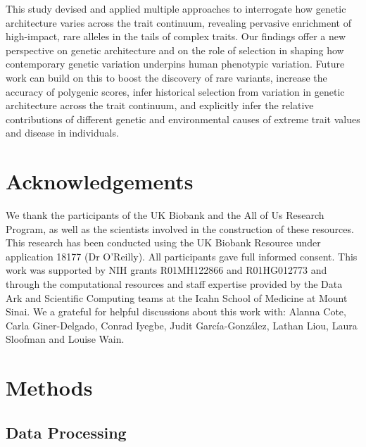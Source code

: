 \documentclass[12pt]{zHenriquesLab-StyleBioRxiv}
\begin{document}
This study devised and applied multiple approaches to interrogate how genetic architecture 
varies across the trait continuum, revealing pervasive enrichment of high-impact, 
rare alleles in the tails of complex traits. Our findings offer a new perspective on 
genetic architecture and on the role of selection in shaping how contemporary genetic 
variation underpins human phenotypic variation. Future work can build on this to boost 
the discovery of rare variants, increase the accuracy of polygenic scores, infer historical 
selection from variation in genetic architecture across the trait continuum, 
and explicitly infer the relative contributions of different genetic and environmental 
causes of extreme trait values and disease in individuals.
%
%
%
%
%
%
%
%
%
%
%
%
%
%
%
%
%
%
%
%
%
%
%
%
%
%
%
%
%
%
%
%
%
%
%
%
%
%
%
%
%
%
%
%
\section*{Acknowledgements}
We thank the participants of the UK Biobank and the All of Us Research Program, as well as the scientists involved in
the construction of these resources. This research has been conducted using
the UK Biobank Resource under application 18177 (Dr O’Reilly). All participants gave full informed consent. This work was supported by NIH grants R01MH122866 and R01HG012773 and through the computational resources and staff expertise provided by the Data Ark and Scientific Computing teams at the Icahn School of Medicine at Mount Sinai. We a grateful for helpful discussions about this work with: Alanna Cote, Carla Giner-Delgado, Conrad Iyegbe, Judit García-González, Lathan Liou, Laura Sloofman and Louise Wain. 


\clearpage \newpage 
\section*{Methods} \label{sec:methods} 
\subsection*{Data Processing} \label{sec:methods:dataProcessing}
\end{document}
